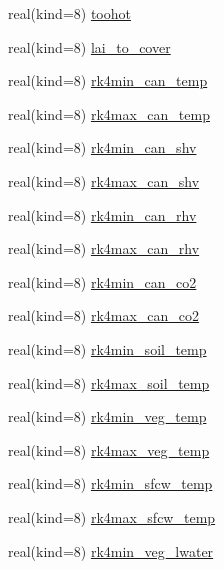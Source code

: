 \begin{DoxyCompactItemize}
\item 
real(kind=8) \hyperlink{namespacerk4__coms_a759040e06196aa6e44844e731b1140ba}{toohot}
\item 
real(kind=8) \hyperlink{namespacerk4__coms_a5af034bb3daf3fd270550fe26a843ced}{lai\+\_\+to\+\_\+cover}
\item 
real(kind=8) \hyperlink{namespacerk4__coms_a5896e577e06a78e013f72e048e907250}{rk4min\+\_\+can\+\_\+temp}
\item 
real(kind=8) \hyperlink{namespacerk4__coms_a6eed732a4c1930bb16dbe70b959bb270}{rk4max\+\_\+can\+\_\+temp}
\item 
real(kind=8) \hyperlink{namespacerk4__coms_a0f723d7acf2f73c4f997825e4b79eb66}{rk4min\+\_\+can\+\_\+shv}
\item 
real(kind=8) \hyperlink{namespacerk4__coms_a8f00e104965b6c83b49b597f34d8432a}{rk4max\+\_\+can\+\_\+shv}
\item 
real(kind=8) \hyperlink{namespacerk4__coms_aea541e4460a2030f1873fb118b1b3341}{rk4min\+\_\+can\+\_\+rhv}
\item 
real(kind=8) \hyperlink{namespacerk4__coms_addc14b5fd10ebce828e187eb2e0c8101}{rk4max\+\_\+can\+\_\+rhv}
\item 
real(kind=8) \hyperlink{namespacerk4__coms_ab56f9190507acf74210f49d44165dd57}{rk4min\+\_\+can\+\_\+co2}
\item 
real(kind=8) \hyperlink{namespacerk4__coms_ab0d46d8c6ddc6f99dd0a0800217b712e}{rk4max\+\_\+can\+\_\+co2}
\item 
real(kind=8) \hyperlink{namespacerk4__coms_a4995d06d19518eaad240d240ce72ebf3}{rk4min\+\_\+soil\+\_\+temp}
\item 
real(kind=8) \hyperlink{namespacerk4__coms_ae58a286e741a74a2ef97b1b9c1244efd}{rk4max\+\_\+soil\+\_\+temp}
\item 
real(kind=8) \hyperlink{namespacerk4__coms_a47c8d9b57e934ed14af1cbf674ac8121}{rk4min\+\_\+veg\+\_\+temp}
\item 
real(kind=8) \hyperlink{namespacerk4__coms_a98bd8400baa088828a1aef2e4ecb1c65}{rk4max\+\_\+veg\+\_\+temp}
\item 
real(kind=8) \hyperlink{namespacerk4__coms_af9e3e44bc9f58496638933f7d9594172}{rk4min\+\_\+sfcw\+\_\+temp}
\item 
real(kind=8) \hyperlink{namespacerk4__coms_ad4588558a29ea0d798ee7146b3d2d403}{rk4max\+\_\+sfcw\+\_\+temp}
\item 
real(kind=8) \hyperlink{namespacerk4__coms_a72cb854b5fc4d3e198b318f596828d90}{rk4min\+\_\+veg\+\_\+lwater}
\item 

\end{DoxyCompactItemize}
